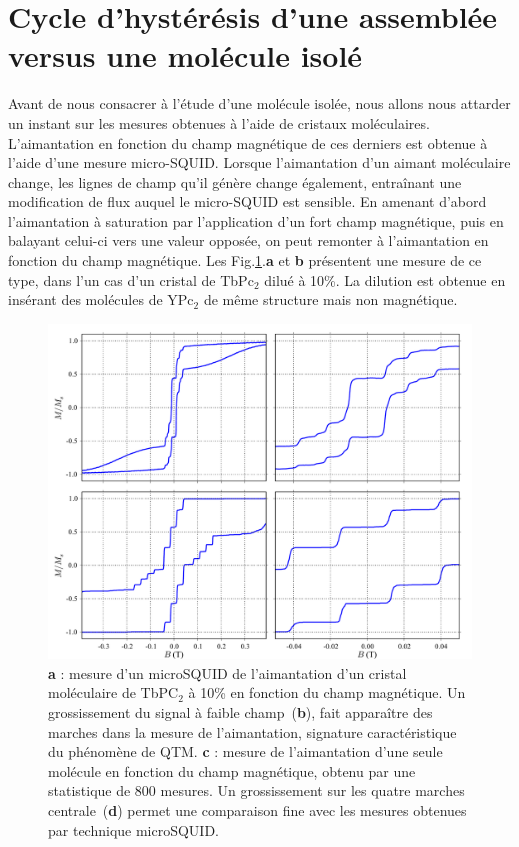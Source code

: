 \section{Cycle d’hystérésis d'une assemblée versus une molécule isolé}
Avant de nous consacrer à l'étude d'une molécule isolée, nous allons nous attarder un instant sur les mesures obtenues à l'aide de cristaux moléculaires. L'aimantation en fonction du champ magnétique de ces derniers est obtenue à l'aide d'une mesure micro-SQUID. Lorsque l'aimantation d'un aimant moléculaire change, les lignes de champ qu'il génère change également, entraînant une modification de flux auquel le micro-SQUID est sensible. En amenant d'abord l'aimantation à saturation par l'application d'un fort champ magnétique, puis en balayant celui-ci vers une valeur opposée, on peut remonter à l'aimantation en fonction du champ magnétique. Les Fig.\ref{CompAimant}.\textbf{a} et \textbf{b} présentent une mesure de ce type, dans l'un cas d'un cristal de TbPc$_2$ dilué à 10\%. La dilution est obtenue en insérant des molécules de YPc$_2$ de même structure mais non magnétique.

\begin{figure}
\includegraphics[scale=0.45]{Resultats/CompCrisMolUnique/CompCrisMolUnique.pdf} 
\caption{\textbf{a} : mesure d'un microSQUID de l'aimantation d'un cristal moléculaire de TbPC$_{2}$ à 10\% en fonction du champ magnétique. Un grossissement du signal à faible champ~(\textbf{b}), fait apparaître des marches dans la mesure de l'aimantation, signature caractéristique du phénomène de QTM. \textbf{c} : mesure de l'aimantation d'une seule molécule en fonction du champ magnétique, obtenu par une statistique de 800 mesures. Un grossissement sur les quatre marches centrale~(\textbf{d}) permet une comparaison fine avec les mesures obtenues par technique microSQUID.}
\label{CompAimant}
\end{figure}



